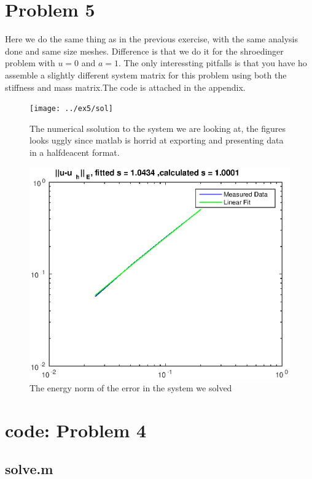 \documentclass[11pt]{article}
\begin{document}
\section{Problem 5}
Here we do the same thing as in the previous exercise, with the same analysis done and same size meshes. Difference is that we do it for the shroedinger problem with $u=0$ and $a=1$. The only interessting pitfalls is that you have ho assemble a slightly different system matrix for this problem using both the stiffness and mass matrix.The code is attached in the appendix.

\begin{figure}[H]
	\centering
	\texttt{[image: ../ex5/sol]}
	\caption{The numerical ssolution to the system we are looking at, the figures looks uggly since matlab is horrid at exporting and presenting data in a halfdeacent format.}
	\label{fig:ex5sol}
\end{figure}
\begin{figure}[H]
	\centering
	\includegraphics[width=1\textwidth]{../ex5/error}
	\caption{The energy norm of the error in the system we solved}
	\label{fig:ex5error}
\end{figure}

\newpage
\appendix
\section{code: Problem 4}
\subsection{solve.m}
\end{document}

